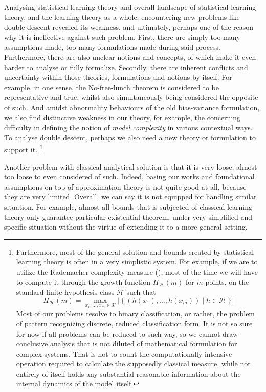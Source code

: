 \documentclass[twoside,10pt]{article}
\begin{document}
Analysing statistical learning theory and overall landscape of statistical learning theory, and the learning theory as a whole, encountering new problems like double descent revealed its weakness, and ultimately, perhaps one of the reason why it is ineffective against such problem. First, there are simply too many assumptions made, too many formulations made during said process. Furthermore, there are also unclear notions and concepts, of which make it even harder to analyse or fully formalize. Secondly, there are inherent conflicts and uncertainty within those theories, formulations and notions by itself. For example, in one sense, the No-free-lunch theorem is considered to be representative and true, whilst also simultaneously being considered the opposite of such. And amidst abnormality behaviours of the old bias-variance formulation, we also find distinctive weakness in our theory, for example, the concerning difficulty in defining the notion of \textit{model complexity} in various contextual ways. To analyse double descent, perhaps we also need a new theory or formulation to support it. \footnote{Furthermore, most of the general solution and bounds created by statistical learning theory is often in a very simplistic system. For example, if we are to utilize the Rademacher complexity measure (\cite{10.5555/2371238}), most of the time we will have to compute it through the growth function $\Pi_{\mathcal{H}}(m)$ for $m$ points, on the standard finite hypothesis class $\mathcal{H}$ such that 
\begin{equation}
    \Pi_{\mathcal{H}}(m) = \max_{x_1, \dots, x_m \in \mathcal{X}} \left| \left\{ (h(x_1), \dots, h(x_m)) \mid h \in \mathcal{H} \right\} \right|
\end{equation}
Most of our problems resolve to binary classification, or rather, the problem of pattern recognizing discrete, reduced classification form. It is not so sure for now if all problems can be reduced to such way, so we cannot draw conclusive analysis that is not diluted of mathematical formulation for complex systems. That is not to count the computationally intensive operation required to calculate the supposedly classical measure, while not entirely of itself holds any substantial reasonable information about the internal dynamics of the model itself. }

Another problem with classical analytical solution is that it is very loose, almost too loose to even considered of such. Indeed, basing our works and foundational assumptions on top of approximation theory is not quite good at all, because they are very limited. Overall, we can say it is not equipped for handling similar situation. For example, almost all bounds that is subjected of classical learning theory only guarantee particular existential theorem, under very simplified and specific situation without the virtue of extending it to a more general setting. 
\end{document}
